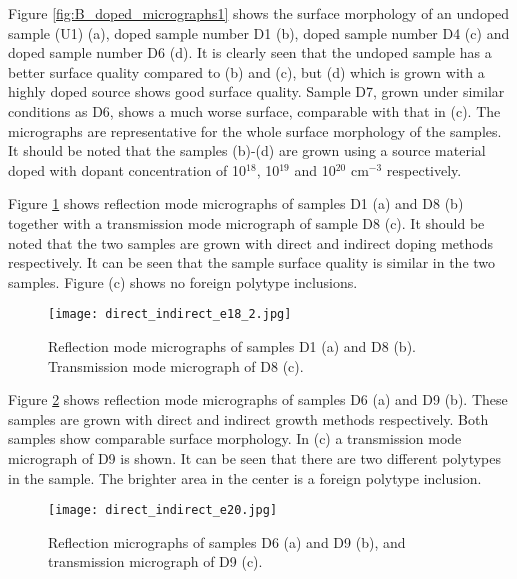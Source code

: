 Figure \ref{fig:B_doped_micrographs1} shows the surface morphology of an undoped sample (U1) (a), doped sample number D1 (b), doped sample number D4 (c) and doped sample number D6 (d). It is clearly seen that the undoped sample has a better surface quality compared to (b) and (c), but (d) which is grown with a highly doped source shows good surface quality. Sample D7, grown under similar conditions as D6, shows a much worse surface, comparable with that in (c). The micrographs are representative for the whole surface morphology of the samples. It should be noted that the samples (b)-(d)   are grown using a source material doped with dopant concentration of 10$^{18}$, 10$^{19}$ and 10$^{20}$ cm$^{-3}$ respectively.

Figure \ref{fig:B_doped_micrographs2} shows reflection mode micrographs of samples D1 (a) and D8 (b) together with a transmission mode micrograph of sample D8 (c). It should be noted that the two samples are grown with direct and indirect doping methods respectively. It can be seen that the sample surface quality is similar in the two samples. Figure (c) shows no foreign polytype inclusions. 

\begin{figure}[h]
\begin{center}
\texttt{[image: direct\_indirect\_e18\_2.jpg]}
\caption{Reflection mode micrographs of samples D1 (a) and D8 (b). Transmission mode micrograph of D8 (c). 
\label{fig:B_doped_micrographs2}}
\end{center}
\end{figure}


Figure \ref{fig:BGe20_micrograph} shows reflection mode micrographs of samples D6 (a) and D9 (b). These samples are grown with direct and indirect growth methods respectively. Both samples show comparable surface morphology. In (c) a transmission mode micrograph of D9 is shown. It can be seen that there are two different polytypes in the sample. The brighter area in the center is a foreign polytype inclusion. 

\begin{figure}[h]
\begin{center}
\texttt{[image: direct\_indirect\_e20.jpg]}
\caption{Reflection micrographs of samples D6 (a) and D9 (b), and transmission micrograph of D9 (c). 
\label{fig:BGe20_micrograph}}
\end{center}
\end{figure}




